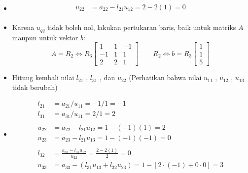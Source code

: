 \documentclass[pdflatex,compress,mathserif]{beamer}
\begin{document}
\begin{frame}
	\begin{itemize}
		\item[]
		\begin{align*}
			u_{22} &= a_{22} - l_{21}u_{12} = 2 - 2(1) = 0 \\
		\end{align*}
		\item Karena $ u_{qq} $ tidak boleh nol, lakukan pertukaran baris, baik untuk matriks $ A $ maupun untuk vektor $ b $:
		\[
		A = R_2 \Leftrightarrow R_3 \begin{bmatrix}
		1 & 1 & -1\\ -1 & 1 & 1 \\ 2 & 2 & 1 
		\end{bmatrix} \qquad R_2 \Leftrightarrow b = R_3\begin{bmatrix}
		1 \\ 1 \\ 5 
		\end{bmatrix}
		\]
		\item Hitung kembali nilai $ l_{21} $ , $ l_{31} $ , dan $ u_{22} $ (Perhatikan bahwa nilai $ u_{11} $ , $ u_{12} $ , $ u_{13} $ tidak berubah)
	\end{itemize}
\end{frame}

\begin{frame}
	\begin{itemize}
		\item[]
		\begin{align*}
		l_{21} &= a_{21}/u_{11} = -1/1 = -1 \\
		l_{31} &= a_{31}/u_{11} = 2/1 = 2 \\
		\\
		u_{22} &= a_{22} - l_{21}u_{12} = 1-(-1)(1) = 2 \\
		u_{23} &= a_{23} - l_{21}u_{13} = 1-(-1)(-1) = 0 \\
		\\
		l_{32} &= \frac{a_{32}-l_{31}u_{12}}{u_{22}} = \frac{2-2(1)}{2} = 0
		\\
		u_{33} &= a_{33} - (l_{31}u_{13}+l_{32}u_{23}) = 1 - [2\cdot(-1) + 0\cdot0] = 3
		\end{align*}
	\end{itemize}
\end{frame}
\end{document}
